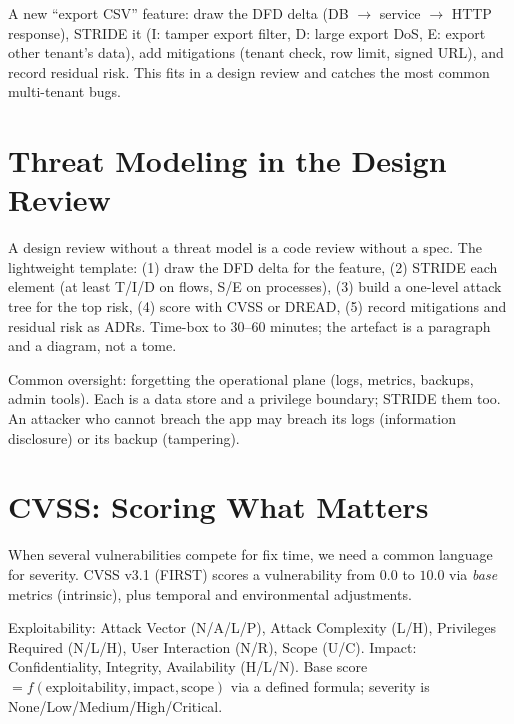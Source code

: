 \begin{example}
A new ``export CSV'' feature: draw the DFD delta (DB $\to$ service $\to$ HTTP response), STRIDE it (I: tamper export filter, D: large export DoS, E: export other tenant's data), add mitigations (tenant check, row limit, signed URL), and record residual risk. This fits in a design review and catches the most common multi-tenant bugs.
\end{example}

\section{Threat Modeling in the Design Review}
\label{sec:tm-review}
A design review without a threat model is a code review without a spec. The lightweight template: (1) draw the DFD delta for the feature, (2) STRIDE each element (at least T/I/D on flows, S/E on processes), (3) build a one-level attack tree for the top risk, (4) score with CVSS or DREAD, (5) record mitigations and residual risk as ADRs. Time-box to 30--60 minutes; the artefact is a paragraph and a diagram, not a tome.

Common oversight: forgetting the operational plane (logs, metrics, backups, admin tools). Each is a data store and a privilege boundary; STRIDE them too. An attacker who cannot breach the app may breach its logs (information disclosure) or its backup (tampering).

\section{CVSS: Scoring What Matters}
\label{sec:cvss}
When several vulnerabilities compete for fix time, we need a common language for severity. CVSS v3.1 (FIRST) scores a vulnerability from $0.0$ to $10.0$ via \emph{base} metrics (intrinsic), plus temporal and environmental adjustments.

{\sloppy
\begin{definition}
Exploitability: Attack Vector (N/A/L/P), Attack Complexity (L/H), Privileges Required (N/L/H), User Interaction (N/R), Scope (U/C). Impact: Confidentiality, Integrity, Availability (H/L/N). Base score $= f(\text{exploitability},\text{impact},\text{scope})$ via a defined formula; severity is None/Low/Medium/High/Critical.
\end{definition}
\par}

